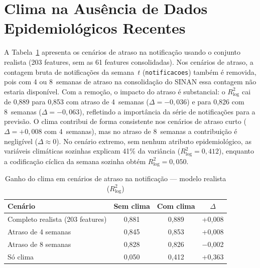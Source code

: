 \section{Clima na Ausência de Dados Epidemiológicos Recentes}
\label{sec:res_blindness}

A Tabela~\ref{tab:blindness} apresenta os cenários de atraso na notificação usando o conjunto realista (203 features, sem as 61 features consolidadas). Nos cenários de atraso, a contagem bruta de notificações da semana~$t$ (\texttt{notificacoes}) também é removida, pois com 4 ou 8~semanas de atraso na consolidação do SINAN essa contagem não estaria disponível. Com a remoção, o impacto do atraso é substancial: o $R^2_{\log}$ cai de 0,889 para 0,853 com atraso de 4~semanas ($\Delta=-0{,}036$) e para 0,826 com 8~semanas ($\Delta=-0{,}063$), refletindo a importância da série de notificações para a previsão. O clima contribui de forma consistente nos cenários de atraso curto ($\Delta=+0{,}008$ com 4~semanas), mas no atraso de 8~semanas a contribuição é negligível ($\Delta \approx 0$). No cenário extremo, sem nenhum atributo epidemiológico, as variáveis climáticas sozinhas explicam 41\% da variância ($R^2_{\log} = 0{,}412$), enquanto a codificação cíclica da semana sozinha obtém $R^2_{\log}=0{,}050$.

\begin{table}[htb]
\centering
\caption{Ganho do clima em cenários de atraso na notificação --- modelo realista ($R^2_{\log}$)}
\label{tab:blindness}
\begin{tabular}{|l|c|c|c|}
\hline
\textbf{Cenário} & \textbf{Sem clima} & \textbf{Com clima} & \textbf{$\Delta$} \\ \hline
Completo realista (203 features) & 0,881 & 0,889 & +0,008 \\ \hline
Atraso de 4 semanas & 0,845 & 0,853 & +0,008 \\ \hline
Atraso de 8 semanas & 0,828 & 0,826 & $-$0,002 \\ \hline
Só clima & 0,050 & 0,412 & +0,363 \\ \hline
\end{tabular}
\end{table}

